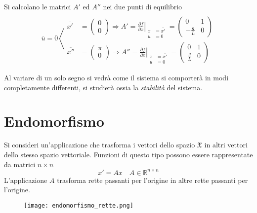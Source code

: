 Si calcolano le matrici $A'$ ed $A''$ nei due punti di equilibrio
$$
\overline{u} = 0 \left\langle
\begin{aligned}
 \\
 \overline{x'} &= \begin{pmatrix}
                  0 \\ 0
                 \end{pmatrix} \Rightarrow
                 A' = \left.\frac{\partial f}{\partial x}
                            \right|_{\begin{aligned}
                                      x &= \overline{x'}\\
                                      u &= 0
                                     \end{aligned}} =
                                     \begin{pmatrix}
                                      0 & 1 \\
                                      -\frac{g}{L} & 0
                                     \end{pmatrix}
\\
 \overline{x''} &= \begin{pmatrix}
                   \pi \\ 0
                  \end{pmatrix} \Rightarrow
                 A'' = \left.\frac{\partial f}{\partial x}
                            \right|_{\begin{aligned}
                                      x &= \overline{x'}\\
                                      u &= 0
                                     \end{aligned}} =
                                     \begin{pmatrix}
                                      0 & 1 \\
                                      \frac{g}{L} & 0
                                     \end{pmatrix}
\end{aligned} \right.
$$

Al variare di un solo segno si vedrà come il sistema si comporterà in modi
completamente differenti, si studierà ossia la \textit{stabilità} del sistema.

\section{Endomorfismo}
Si consideri un'applicazione che trasforma i vettori dello spazio
$\mathfrak{X}$ in altri vettori dello stesso spazio vettoriale.
Funzioni di questo tipo possono essere rappresentate da matrici $n\times n$
$$
x' = Ax\quad A\in\mathbb{R}^{n\times n}
$$
L'applicazione $A$ trasforma rette passanti per l'origine in altre rette
passanti per l'origine.
\begin{figure}[h]
 \centering
 \texttt{[image: endomorfismo\_rette.png]}
 \label{Fig.:endomorfismo_rette}
\end{figure}

